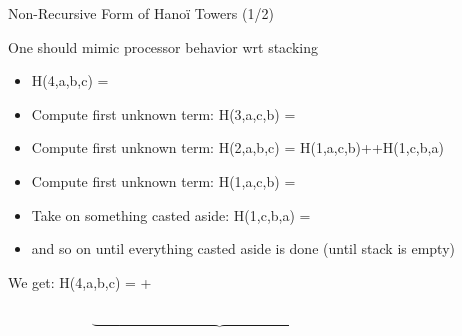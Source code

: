 \begin{frame}{Non-Recursive Form of Hanoï Towers (1/2)}
  \centerline{}\medskip

  \begin{block}{One should mimic processor behavior wrt stacking}
    \begin{itemize}
    \item H(4,a,b,c) = 
    \item<2-> Compute first unknown term:\hfill
              \alert<2>{H(3,a,c,b)} = 
    \item<3-> Compute first unknown term:\hfill
              \alert<3>{H(2,a,b,c)} = \alert<4>{H(1,a,c,b)}++\alert<5>{H(1,c,b,a)}
    \item<4-> Compute first unknown term:\hfill
              \alert<4>{H(1,a,c,b)} = 
    \item<5-> Take on something casted aside:\hfill
              \alert<5>{H(1,c,b,a)} = 
    \item<6-> and so on until everything casted aside is done (until stack
      is empty)
    \end{itemize}
  \end{block}\vspace{-.7\baselineskip}
  \begin{block}{We get:}\medskip
  H(4,a,b,c) = %
               +%


  \vspace{-.7\baselineskip}              
  $\qquad\qquad\qquad\underbrace{\quad\qquad\qquad\qquad\qquad\qquad\qquad\qquad\qquad\:\quad}$

  $\qquad\qquad\qquad\qquad\qquad\qquad\:$
  \end{block}
\end{frame}
